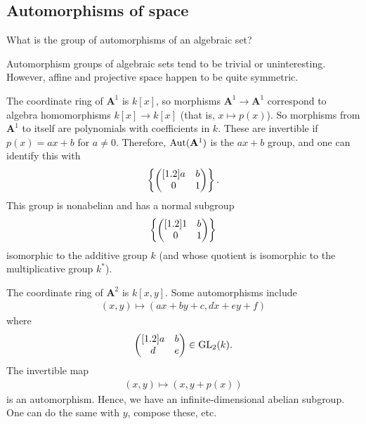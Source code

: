 \documentclass[11pt, oneside,margin=1in]{article}
\begin{document}
\subsection{Automorphisms of space}

\begin{problem}
	What is the group of automorphisms of an algebraic set?
\end{problem}

Automorphism groups of algebraic sets tend to be trivial or uninteresting. However, affine and projective space happen to be quite symmetric.

\begin{example}\label{}\text{}
The coordinate ring of $\mathbf{A}^1$ is $k[x]$, so morphisms $\mathbf{A}^1\longrightarrow \mathbf{A}^1$ correspond to algebra homomorphisms $k[x]\longrightarrow k[x]$ (that is, $x\longmapsto p(x)$). So morphisms from $\mathbf{A}^1$ to itself are polynomials with coefficients in $k$. These are invertible if $p(x) = ax+b$ for $a\ne 0$. Therefore, $\operatorname{Aut}(\mathbf{A}^1)$ is the $ax+b$ group, and one can identify this with
\begin{align*}
	\left\{ \begin{pmatrix} [ 1.2 ] a&b\\0&1\end{pmatrix} \right\}. 
\end{align*}
This group is nonabelian and has a normal subgroup 
\begin{align*}
	\left\{\begin{pmatrix} [ 1.2 ]  1&b\\0&1\end{pmatrix} \right\} 
\end{align*}
isomorphic to the additive group $k$ (and whose quotient is isomorphic to the multiplicative group $k^*$).
\end{example}

\begin{example}\label{}\text{}
The coordinate ring of $\mathbf{A}^2$ is $k[x,y]$. Some automorphisms include 
\begin{align*}
	(x,y)\longmapsto (ax+by+c, dx+ey+f) 
\end{align*}
where
\begin{align*}
	\begin{pmatrix} [ 1.2 ] a&b\\d&e\end{pmatrix} \in \operatorname{GL}_{2}(k).
\end{align*}
The invertible map
\begin{align*}
	(x,y)\longmapsto  (x,y+p(x))
\end{align*}
is an automorphism. Hence, we have an infinite-dimensional abelian subgroup. One can do the same with $y$, compose these, etc. 
\end{example}
\end{document}
